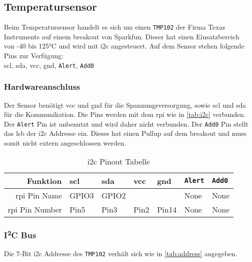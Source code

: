 \subsection{Temperatursensor}

Beim Temperatursensor handelt es sich um einen \texttt{TMP102} der Firma Texas Instruments auf einem \gls{breakout} von Sparkfun.
Dieser hat einen Einsatzbereich von -40 bis 125°C und wird mit \gls{i2c} angesteuert.
Auf dem Sensor stehen folgende Pins zur Verfügung: \\
\gls{scl}, \gls{sda}, \gls{vcc}, \gls{gnd}, \texttt{Alert}, \texttt{Add0}

\subsubsection{Hardwareanschluss}

Der Sensor benötigt \gls{vcc} und \gls{gnd} für die Spannungsversorgung, sowie \gls{scl} und \gls{sda} für die Kommunikation.
Die Pins werden mit dem \gls{rpi} wie in \autoref{tab:i2c} verbunden.
Der \texttt{Alert} Pin ist unbenutzt und wird daher nicht verbunden.
Der \texttt{Add0} Pin stellt das \gls{lsb} der \gls{i2c} Addresse ein.
Dieses hat einen Pullup auf dem \gls{breakout} und muss somit nicht extern angeschlossen werden.

\begin{table}[h]
    \centering
    \begin{tabular}{|r||l|l|l|l|l|l|}
        \hline
        \textbf{Funktion} & \textbf{\gls{scl}} & \textbf{\gls{sda}} & \textbf{\gls{vcc}} & \textbf{\gls{gnd}} & \textbf{\texttt{Alert}} & \textbf{\texttt{Add0}}\\
        \hline
        \hline
        \gls{rpi} Pin Name & GPIO3 & GPIO2 & & & None & None \\
        \hline
        \gls{rpi} Pin Number & Pin5 & Pin3 & Pin2 & Pin14 & None & None \\
        \hline
    \end{tabular}
    \caption{\gls{i2c} Pinout Tabelle}
    \label{tab:i2c}
\end{table}

\subsubsection{I\textsuperscript{2}C Bus}

Die $7$-Bit \gls{i2c} Addresse des \texttt{TMP102} verhält sich wie in \autoref{tab:address} angegeben.

